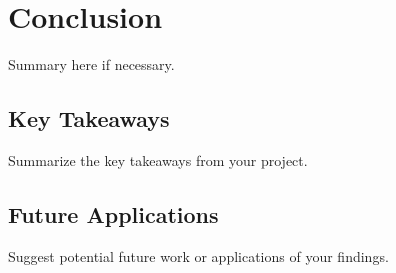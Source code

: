 \chapter{Conclusion}
\label{ch:conclusion}

Summary here if necessary.

\section{Key Takeaways}
Summarize the key takeaways from your project.

\section{Future Applications}
Suggest potential future work or applications of your findings.